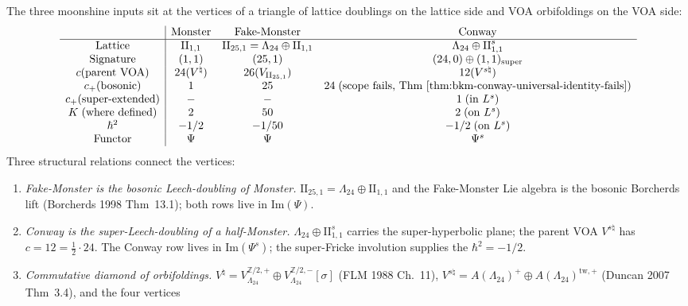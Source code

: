 \begin{remark}
\label{rem:bkm-conway-monster-fake-monster-triangle}
The three moonshine inputs sit at the vertices of a triangle of
lattice doublings on the lattice side and VOA orbifoldings on the
VOA side:
\[
\begin{array}{c|ccc}
 & \text{Monster} & \text{Fake-Monster} & \text{Conway} \\
\hline
\text{Lattice} & \mathrm{II}_{1,1} & \mathrm{II}_{25,1} = \Lambda_{24}\oplus\mathrm{II}_{1,1}
 & \Lambda_{24}\oplus\mathrm{II}_{1,1}^{s} \\
\text{Signature} & (1,1) & (25,1) & (24,0)\oplus (1,1)_{\mathrm{super}} \\
c(\text{parent VOA}) & 24 (V^\natural) & 26 (V_{\mathrm{II}_{25,1}}) & 12 (V^{s\natural}) \\
c_+(\text{bosonic}) & 1 & 25 & 24\;(\text{scope fails, Thm~\ref{thm:bkm-conway-universal-identity-fails}}) \\
c_+(\text{super-extended}) & - & - & 1\;(\text{in }L^{s}) \\
K\;(\text{where defined}) & 2 & 50 & 2\;(\text{on }L^{s}) \\
\hbar^2 & -1/2 & -1/50 & -1/2\;(\text{on }L^{s}) \\
\text{Functor} & \Psi & \Psi & \Psi^{s}
\end{array}
\]
Three structural relations connect the vertices:
\begin{enumerate}[label=\textup{(\roman*)}]
\item \emph{Fake-Monster is the bosonic Leech-doubling of Monster.}
$\mathrm{II}_{25,1} = \Lambda_{24}\oplus\mathrm{II}_{1,1}$ and the
Fake-Monster Lie algebra is the bosonic Borcherds lift
(Borcherds 1998 Thm~13.1); both rows live in
$\mathrm{Im}(\Psi)$.
\item \emph{Conway is the super-Leech-doubling of a
half-Monster.}
$\Lambda_{24}\oplus\mathrm{II}_{1,1}^{s}$ carries the
super-hyperbolic plane; the parent VOA $V^{s\natural}$ has
$c = 12 = \tfrac{1}{2}\cdot 24$. The Conway row lives in
$\mathrm{Im}(\Psi^{s})$; the super-Fricke involution supplies the
$\hbar^2 = -1/2$.
\item \emph{Commutative diamond of orbifoldings.}
$V^\natural = V_{\Lambda_{24}}^{\mathbb Z/2,+}\oplus
V_{\Lambda_{24}}^{\mathbb Z/2,-}[\sigma]$ (FLM 1988 Ch.~11),
$V^{s\natural} = A(\Lambda_{24})^{+}\oplus A(\Lambda_{24})^{\mathrm{tw},+}$
(Duncan 2007 Thm~3.4), and the four vertices

\end{enumerate}
\end{remark}
